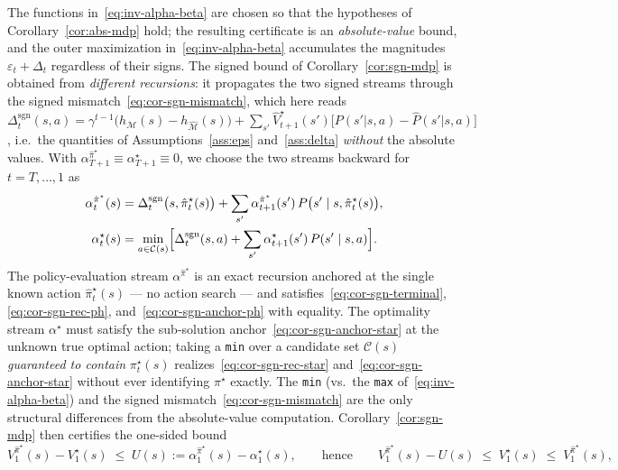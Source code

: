 \documentclass[10pt]{article}
\theoremstyle{definition}
\newcommand{\Dsgn}{\Delta^{\mathrm{sgn}}}
\begin{document}
The functions in~\eqref{eq:inv-alpha-beta} are chosen so that the
hypotheses of Corollary~\ref{cor:abs-mdp} hold; the resulting
certificate is an \emph{absolute-value} bound, and the outer
maximization in~\eqref{eq:inv-alpha-beta} accumulates the magnitudes
$\varepsilon_t + \Delta_t$ regardless of their signs. The signed bound
of Corollary~\ref{cor:sgn-mdp} is obtained from \emph{different
recursions}: it propagates the two signed streams through the signed
mismatch~\eqref{eq:cor-sgn-mismatch}, which here reads
$\Dsgn_t(s,a) = \gamma^{t-1}\bigl(h_{\mathcal{M}}(s) -
h_{\hat{\mathcal{M}}}(s)\bigr) + \sum_{s'}\hat V^\star_{t+1}(s')
\bigl[P(s'|s,a) - \hat P(s'|s,a)\bigr]$, i.e.\ the quantities of
Assumptions~\ref{ass:eps} and~\ref{ass:delta} \emph{without} the
absolute values. With $\alpha^{\hat\pi^\star}_{T+1} \equiv
\alpha^\star_{T+1} \equiv 0$, we choose the two streams backward for
$t = T, \dots, 1$ as
\begin{equation}
\begin{aligned}
\alpha^{\hat\pi^\star}_t(s)
&= \Dsgn_t\bigl(s, \hat\pi^\star_t(s)\bigr)
  + \sum_{s'} \alpha^{\hat\pi^\star}_{t+1}(s')\,
    P\bigl(s'\mid s, \hat\pi^\star_t(s)\bigr),\\
\alpha^{\star}_t(s)
&= \min_{a \in \mathcal{C}(s)}\Bigl[\Dsgn_t(s,a)
  + \sum_{s'} \alpha^{\star}_{t+1}(s')\, P(s'\mid s, a)\Bigr].
\end{aligned}
\label{eq:inv-signed-streams}
\end{equation}
The policy-evaluation stream $\alpha^{\hat\pi^\star}$ is an exact
recursion anchored at the single known action $\hat\pi^\star_t(s)$ ---
no action search --- and satisfies~\eqref{eq:cor-sgn-terminal},
\eqref{eq:cor-sgn-rec-ph}, and~\eqref{eq:cor-sgn-anchor-ph} with
equality. The optimality stream $\alpha^\star$ must satisfy the
sub-solution anchor~\eqref{eq:cor-sgn-anchor-star} at the unknown true
optimal action; taking a \texttt{min} over a candidate set
$\mathcal{C}(s)$ \emph{guaranteed to contain} $\pi^\star_t(s)$
realizes~\eqref{eq:cor-sgn-rec-star} and~\eqref{eq:cor-sgn-anchor-star}
without ever identifying $\pi^\star$ exactly. The \texttt{min} (vs.\
the \texttt{max} of~\eqref{eq:inv-alpha-beta}) and the signed
mismatch~\eqref{eq:cor-sgn-mismatch} are the only structural
differences from the absolute-value computation.
Corollary~\ref{cor:sgn-mdp} then certifies the one-sided bound
\begin{equation}
V^{\hat\pi^\star}_1(s) - V^\star_1(s)
\;\le\; U(s) := \alpha^{\hat\pi^\star}_1(s) - \alpha^{\star}_1(s),
\qquad\text{hence}\qquad
V^{\hat\pi^\star}_1(s) - U(s) \;\le\; V^\star_1(s)
\;\le\; V^{\hat\pi^\star}_1(s),
\label{eq:inv-U}
\end{equation}
\end{document}
